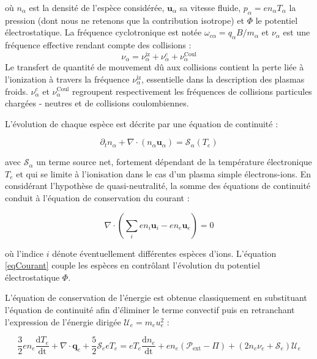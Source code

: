 \begin{refsection}
où $n_\alpha$ est la densité de l'espèce considérée, $\mathbf{u}_\alpha$ sa
vitesse fluide, $p_\alpha =en_\alpha T_\alpha$ la pression (dont nous ne
retenons que la contribution isotrope) et $\Phi$ le potentiel électrostatique. La fréquence
cyclotronique est notée $\omega_{c\alpha}=q_\alpha B/m_\alpha$ et $\nu_\alpha$
est une fréquence effective rendant compte des collisions :
\begin{equation*}
\nu_\alpha=\nu_{\alpha}^\text{iz}+\nu_{\alpha}^{c}+\nu_{\alpha}^\text{Coul}
\end{equation*}
Le transfert de quantité de mouvement dû aux collisions contient la perte liée à
l'ionization à travers la fréquence $\nu_{\alpha}^\text{iz}$, essentielle dans
la description des plasmas froids. $\nu_{\alpha}^{c}$ et
$\nu_{\alpha}^\text{Coul}$ regroupent respectivement les fréquences de
collisions particules chargées - neutres et de collisions coulombiennes.

L'évolution de chaque espèce est décrite par une équation de continuité :

\begin{equation}
\label{3-continuite}
\partial_t n_\alpha +
\nabla\cdot\left(n_\alpha\mathbf{u}_\alpha\right)=\mathcal{S}_\alpha(T_e)
\end{equation}

avec $\mathcal{S}_\alpha$ un terme source net, fortement dépendant de la
température électronique $T_e$ et qui se limite à l'ionisation dans le cas d'un
plasma simple électrons-ions.
En considérant l'hypothèse de quasi-neutralité, la somme des équations de
continuité conduit à l'équation de conservation du courant :

\begin{equation}
\label{eqCourant}
\nabla\cdot(\sum_ien_i\mathbf{u}_i-en_e\mathbf{u}_e)=0
\end{equation}

où l'indice $i$ dénote éventuellement différentes espèces d'ions. 
L'équation \eqref{eqCourant} couple les espèces en contrôlant
l'évolution du potentiel électrostatique $\Phi$.

L'équation de conservation de l'énergie est obtenue classiquement en substituant
l'équation de continuité afin d'éliminer le terme convectif puis en retranchant
l'expression de l'énergie dirigée $\mathcal{U}_e=m_eu_e^2$ :

\begin{equation}
\label{3-eqTemperature}
\frac{3}{2}en_e\frac{\text{d}T_e}{\text{dt}}+\nabla\cdot\mathbf
q_e + \frac{5}{2}\mathcal{S}_e eT_e = eT_e\frac{\text{d}n_e}{\text{dt}}+ 
{en_e\left(\mathcal{P}_\text{ext}-\Pi\right)}+(2n_e\nu_e+\mathcal{S}_e)\mathcal{U}_e
\end{equation}


\end{refsection}
